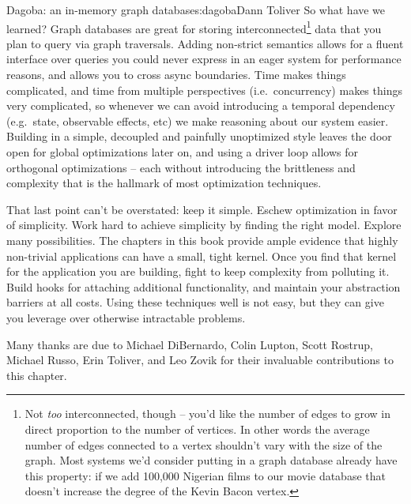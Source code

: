 \begin{aosachapter}{Dagoba: an in-memory graph database}{s:dagoba}{Dann Toliver}
So what have we learned? Graph databases are great for storing
interconnected\footnote{Not \emph{too} interconnected, though -- you'd
  like the number of edges to grow in direct proportion to the number of
  vertices. In other words the average number of edges connected to a
  vertex shouldn't vary with the size of the graph. Most systems we'd
  consider putting in a graph database already have this property: if we
  add 100,000 Nigerian films to our movie database that doesn't increase
  the degree of the Kevin Bacon vertex.} data that you plan to query via
graph traversals. Adding non-strict semantics allows for a fluent
interface over queries you could never express in an eager system for
performance reasons, and allows you to cross async boundaries. Time
makes things complicated, and time from multiple perspectives
(i.e.~concurrency) makes things very complicated, so whenever we can
avoid introducing a temporal dependency (e.g.~state, observable effects,
etc) we make reasoning about our system easier. Building in a simple,
decoupled and painfully unoptimized style leaves the door open for
global optimizations later on, and using a driver loop allows for
orthogonal optimizations -- each without introducing the brittleness and
complexity that is the hallmark of most optimization techniques.

That last point can't be overstated: keep it simple. Eschew optimization
in favor of simplicity. Work hard to achieve simplicity by finding the
right model. Explore many possibilities. The chapters in this book
provide ample evidence that highly non-trivial applications can have a
small, tight kernel. Once you find that kernel for the application you
are building, fight to keep complexity from polluting it. Build hooks
for attaching additional functionality, and maintain your abstraction
barriers at all costs. Using these techniques well is not easy, but they
can give you leverage over otherwise intractable problems.

\label{acknowledgements}

Many thanks are due to Michael DiBernardo, Colin Lupton, Scott Rostrup,
Michael Russo, Erin Toliver, and Leo Zovik for their invaluable
contributions to this chapter.

\end{aosachapter}
